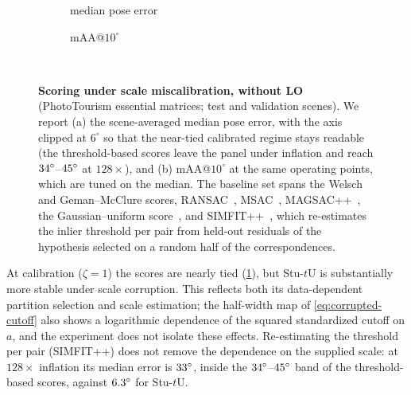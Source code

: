 \documentclass[runningheads]{llncs}
\newcommand{\stuU}{Stu-$t$U}
\begin{document}
\begin{figure}[t]
	\centering
	\begin{subfigure}[t]{0.48\linewidth}
		\centering
		\caption{median pose error}
	\end{subfigure}\hfill
	\begin{subfigure}[t]{0.48\linewidth}
		\centering
		\caption{mAA@$10^\circ$}
	\end{subfigure}\\[3pt]
	\caption{\textbf{Scoring under scale miscalibration, without LO}
		(PhotoTourism essential matrices; \PTTestScenes{} test and \PTValScenes{} validation scenes). We report (a) the
		scene-averaged median pose error, with the axis clipped at $6^\circ$ so
		that the near-tied calibrated regime stays readable (the threshold-based
		scores leave the panel under inflation and reach $34^\circ$--$45^\circ$
		at $128\times$), and (b) mAA@$10^\circ$ at the same operating points,
		which are tuned on the median. The baseline set spans the Welsch and Geman--McClure scores, RANSAC~\cite{Fischler1981},
		MSAC~\cite{Torr1998}, MAGSAC++~\cite{Barath2020}, the
		Gaussian--uniform score~\cite{Shekhovtsov2025}, and SIMFIT++~\cite{Edstedt2025},
		which re-estimates the inlier threshold per pair from held-out
		residuals of the hypothesis selected on a random half of the
		correspondences.}
	\label{fig:supp-sel-miscal}
\end{figure}

At calibration ($\zeta=1$) the scores are nearly tied
(\cref{fig:supp-sel-miscal}), but \stuU{} is substantially more stable
under scale corruption. This reflects both its data-dependent partition
selection and scale estimation; the half-width map of
\cref{eq:corrupted-cutoff} also shows a logarithmic dependence of the
squared standardized cutoff on $a$, and the experiment
does not isolate these effects. Re-estimating the threshold per pair
(SIMFIT++) does not remove the dependence on the supplied scale: at
$128\times$ inflation its median error is $33^\circ$, inside the
$34^\circ$--$45^\circ$ band of the threshold-based scores, against
$6.3^\circ$ for \stuU{}.

\end{document}
